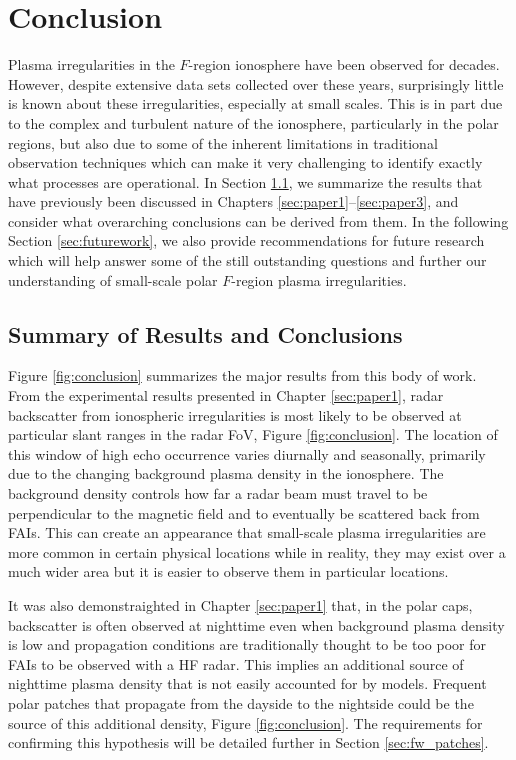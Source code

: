 
\chapter{Conclusion}
\label{sec:conclusion}

Plasma irregularities in the \(F\)-region ionosphere have been observed for decades.  However, despite extensive data sets collected over these years, surprisingly little is known about these irregularities, especially at small scales.  This is in part due to the complex and turbulent nature of the ionosphere, particularly in the polar regions, but also due to some of the inherent limitations in traditional observation techniques which can make it very challenging to identify exactly what processes are operational.  In Section \ref{sec:summary}, we summarize the results that have previously been discussed in Chapters \ref{sec:paper1}--\ref{sec:paper3}, and consider what overarching conclusions can be derived from them.  In the following Section \ref{sec:futurework}, we also provide recommendations for future research which will help answer some of the still outstanding questions and further our understanding of small-scale polar \(F\)-region plasma irregularities.

\section{Summary of Results and Conclusions}
\label{sec:summary}

Figure \ref{fig:conclusion} summarizes the major results from this body of work.  From the experimental results presented in Chapter \ref{sec:paper1}, radar backscatter from ionospheric irregularities is most likely to be observed at particular slant ranges in the radar FoV, Figure \ref{fig:conclusion}.  The location of this window of high echo occurrence varies diurnally and seasonally, primarily due to the changing background plasma density in the ionosphere.  The background density controls how far a radar beam must travel to be perpendicular to the magnetic field and to eventually be scattered back from FAIs.  This can create an appearance that small-scale plasma irregularities are more common in certain physical locations while in reality, they may exist over a much wider area but it is easier to observe them in particular locations. 

It was also demonstraighted in Chapter \ref{sec:paper1} that, in the polar caps, backscatter is often observed at nighttime even when background plasma density is low and propagation conditions are traditionally thought to be too poor for FAIs to be observed with a HF radar.  This implies an additional source of nighttime plasma density that is not easily accounted for by models.  Frequent polar patches that propagate from the dayside to the nightside could be the source of this additional density, Figure \ref{fig:conclusion}.  The requirements for confirming this hypothesis will be detailed further in Section \ref{sec:fw_patches}.


